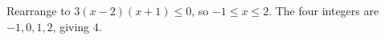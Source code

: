 Rearrange to $3(x-2)(x+1)\le0$, so $-1\le x\le2$. The four integers are $-1,0,1,2$, giving $\boxed4$.

